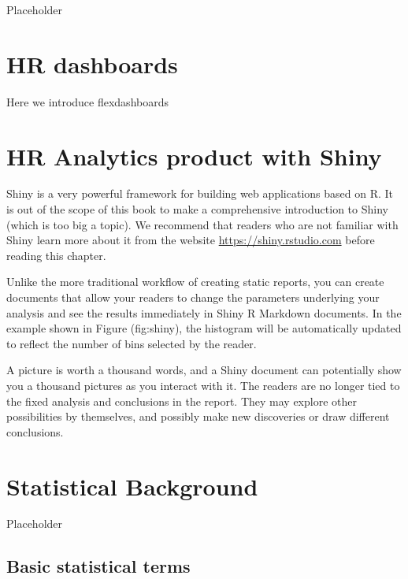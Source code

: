 \documentclass[
  12pt, krantz2,
]{krantz}
\begin{document}
Placeholder

\hypertarget{flexdashboards}{%
\chapter{HR dashboards}\label{flexdashboards}}

Here we introduce flexdashboards

\hypertarget{data-science-product}{%
\chapter{HR Analytics product with Shiny}\label{data-science-product}}

Shiny is a very powerful framework for building web applications based on R. It is out of the scope of this book to make a comprehensive introduction to Shiny (which is too big a topic). We recommend that readers who are not familiar with Shiny learn more about it from the website \url{https://shiny.rstudio.com} before reading this chapter.

Unlike the more traditional workflow of creating static reports, you can create documents that allow your readers to change the parameters underlying your analysis and see the results immediately in Shiny R Markdown documents. In the example shown in Figure \citet{ref}(fig:shiny), the histogram will be automatically updated to reflect the number of bins selected by the reader.

A picture is worth a thousand words, and a Shiny document can potentially show you a thousand pictures as you interact with it. The readers are no longer tied to the fixed analysis and conclusions in the report. They may explore other possibilities by themselves, and possibly make new discoveries or draw different conclusions.

\hypertarget{appendix-appendix}{%
\appendix {}}


\hypertarget{appendixA}{%
\chapter{Statistical Background}\label{appendixA}}

Placeholder

\hypertarget{basic-statistical-terms}{%
\section{Basic statistical terms}\label{basic-statistical-terms}}
\end{document}
